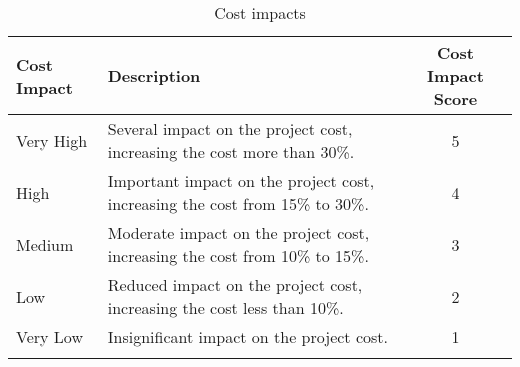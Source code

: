 \begin{longtable}[H]{l >{\raggedright\arraybackslash}p{7.8cm} c}
	
	\toprule[2pt]
	
	\textbf{Cost Impact} &  \textbf{Description}  & \textbf{Cost Impact Score} \\
	
	\midrule [1.5pt]
	\endhead
	
	Very High & Several impact on the project cost, increasing the cost  more than 30\%. & 5
	\vspace{0.2cm} \\
	
	\midrule
	
	High & Important impact on the project cost, increasing the cost from 15\% to 30\%. & 4
	\vspace{0.2cm} \\
	
	\midrule
	
	Medium & Moderate impact on the project cost, increasing the cost from 10\% to 15\%. & 3
	\vspace{0.2cm} \\

	\midrule

	Low & Reduced impact on the project cost, increasing the cost  less than 10\%. & 2
	\vspace{0.2cm} \\

	\midrule

	Very Low & Insignificant impact on the project cost. & 1
	\vspace{0.2cm} \\
		
	\bottomrule[2pt]
	
	\caption{Cost impacts}

\end{longtable}